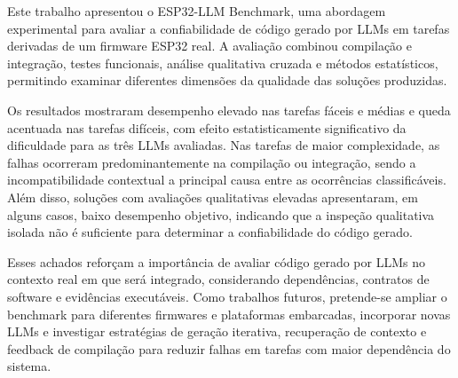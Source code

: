 \documentclass[12pt]{article}
\begin{document}
Este trabalho apresentou o ESP32-LLM Benchmark, uma abordagem experimental para avaliar a confiabilidade de código gerado por LLMs em tarefas derivadas de um firmware ESP32 real. A avaliação combinou compilação e integração, testes funcionais, análise qualitativa cruzada e métodos estatísticos, permitindo examinar diferentes dimensões da qualidade das soluções produzidas.

Os resultados mostraram desempenho elevado nas tarefas fáceis e médias e queda acentuada nas tarefas difíceis, com efeito estatisticamente significativo da dificuldade para as três LLMs avaliadas. Nas tarefas de maior complexidade, as falhas ocorreram predominantemente na compilação ou integração, sendo a incompatibilidade contextual a principal causa entre as ocorrências classificáveis. Além disso, soluções com avaliações qualitativas elevadas apresentaram, em alguns casos, baixo desempenho objetivo, indicando que a inspeção qualitativa isolada não é suficiente para determinar a confiabilidade do código gerado.

Esses achados reforçam a importância de avaliar código gerado por LLMs no contexto real em que será integrado, considerando dependências, contratos de software e evidências executáveis. Como trabalhos futuros, pretende-se ampliar o benchmark para diferentes firmwares e plataformas embarcadas, incorporar novas LLMs e investigar estratégias de geração iterativa, recuperação de contexto e feedback de compilação para reduzir falhas em tarefas com maior dependência do sistema.





\end{document}
